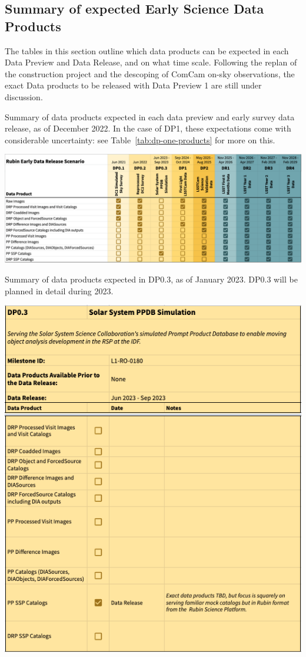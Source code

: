 \subsection{Summary of expected Early Science Data Products} \label{ssec:dataproductsummary}
The tables in this section outline which data products can be expected in each Data Preview and Data Release, and on what time scale.
Following the replan of the construction project and the descoping of ComCam on-sky observations, the exact Data products to be released with Data Preview 1 are still under discussion.

\begin{table}
\caption{Summary of data products expected in each data preview and early survey data release, as of December 2022.
In the case of DP1, these expectations come with considerable uncertainty: see Table~\ref{tab:dp-one-products} for more on this.}
\label{tab:summary}
\includegraphics[width=\linewidth]{figures/DPR-summary}
\end{table}

\begin{table}
\caption{Summary of data products expected in DP0.3, as of January 2023.
DP0.3 will be planned in detail during 2023.}
\label{tab:dp-zpthree-products}
\includegraphics[width=\linewidth]{figures/DP0_3-products}
\end{table}


